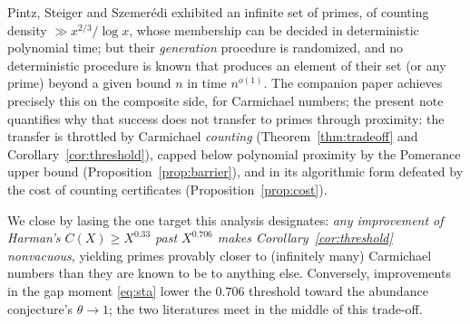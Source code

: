 \documentclass[11pt]{amsart}
\newcommand{\CC}{C}
\begin{document}
Pintz, Steiger and Szemer\'edi \cite{PSS} exhibited an infinite set of primes,
of counting density $\gg x^{2/3}/\log x$, whose membership can be decided in
deterministic polynomial time; but their \emph{generation} procedure is
randomized, and no deterministic procedure is known that produces an element
of their set (or any prime) beyond a given bound $n$ in time $n^{o(1)}$. The
companion paper \cite{Bro} achieves precisely this on the composite side, for
Carmichael numbers; the present note quantifies why that success does not
transfer to primes through proximity: the transfer is throttled by Carmichael
\emph{counting} (Theorem~\ref{thm:tradeoff} and
Corollary~\ref{cor:threshold}), capped below polynomial proximity by the
Pomerance upper bound (Proposition~\ref{prop:barrier}), and in its algorithmic
form defeated by the cost of counting certificates
(Proposition~\ref{prop:cost}).

We close by lasing the one target this analysis designates:
\emph{any improvement of Harman's $\CC(X) \ge X^{0.33}$ past $X^{0.706}$
makes Corollary~\ref{cor:threshold} nonvacuous}, yielding primes provably
closer to (infinitely many) Carmichael numbers than they are known to be to
anything else. Conversely, improvements in the gap moment \eqref{eq:sta}
lower the $0.706$ threshold toward the abundance conjecture's $\theta \to 1$;
the two literatures meet in the middle of this trade-off.
\end{document}
